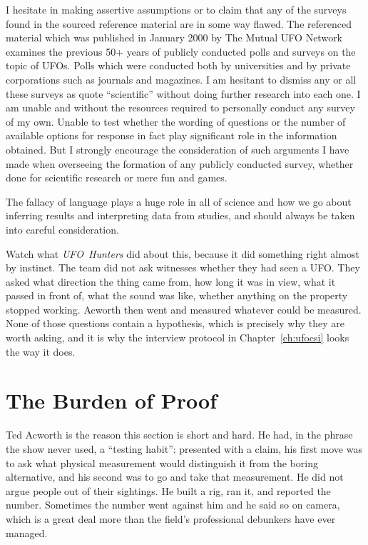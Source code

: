 I hesitate in making assertive assumptions or to claim that any of the surveys
found in the sourced reference material are in some way flawed. The referenced
material which was published in January 2000 by The Mutual UFO Network examines
the previous 50+ years of publicly conducted polls and surveys on the topic of
UFOs. Polls which were conducted both by universities and by private corporations
such as journals and magazines. I am hesitant to dismiss any or all these surveys
as quote ``scientific'' without doing further research into each one. I am unable
and without the resources required to personally conduct any survey of my own.
Unable to test whether the wording of questions or the number of available options
for response in fact play significant role in the information obtained. But I
strongly encourage the consideration of such arguments I have made when overseeing
the formation of any publicly conducted survey, whether done for scientific
research or mere fun and games.

The fallacy of language plays a huge role in all of science and how we go about
inferring results and interpreting data from studies, and should always be taken
into careful consideration.

Watch what \emph{UFO~Hunters} did about this, because it did something right almost by
instinct. The team did not ask witnesses whether they had seen a UFO. They asked what direction
the thing came from, how long it was in view, what it passed in front of, what the sound was like,
whether anything on the property stopped working. Acworth then went and measured whatever could be
measured. None of those questions contain a hypothesis, which is precisely why they are worth
asking, and it is why the interview protocol in Chapter~\ref{ch:ufocsi} looks the way it does.

\section{The Burden of Proof}\label{sec:burdenproof}

Ted Acworth is the reason this section is short and hard. He had, in the phrase the show never
used, a ``testing habit'': presented with a claim, his first move was to ask what physical measurement
would distinguish it from the boring alternative, and his second was to go and take that
measurement. He did not argue people out of their sightings. He built a rig, ran it, and reported
the number. Sometimes the number went against him and he said so on camera, which is a great deal
more than the field's professional debunkers have ever managed.

